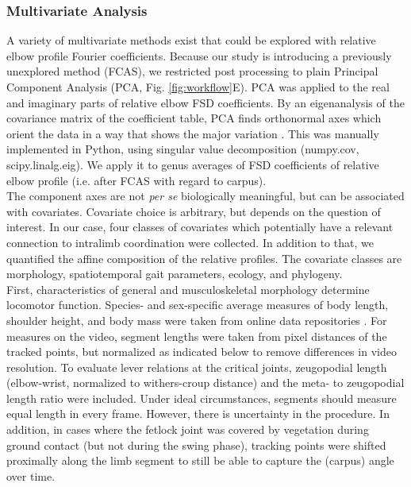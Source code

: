 \subsubsection{Multivariate Analysis}
A variety of multivariate methods exist that could be explored with relative elbow profile Fourier coefficients.
Because our study is introducing a previously unexplored method (FCAS), we restricted post processing to plain Principal Component Analysis (PCA, Fig. \ref{fig:workflow}E).
PCA was applied to the real and imaginary parts of relative elbow FSD coefficients.
By an eigenanalysis of the covariance matrix of the coefficient table, PCA finds orthonormal axes which orient the data in a way that shows the major variation \citep[\textit{cf.}][]{MacLeod2007}.
This was manually implemented in Python, using singular value decomposition (\textsf{numpy.cov}, \textsf{scipy.linalg.eig}).
We apply it to genus averages \citep{Mitteroecker2011} of FSD coefficients of relative elbow profile (i.e. after FCAS with regard to carpus).
\\The component axes are not \textit{per se} biologically meaningful, but can be associated with covariates.
Covariate choice is arbitrary, but depends on the question of interest.
In our case, four classes of covariates which potentially have a relevant connection to intralimb coordination were collected.
In addition to that, we quantified the affine composition of the relative profiles.
The covariate classes are morphology, spatiotemporal gait parameters, ecology, and phylogeny.
\\First, characteristics of general and musculoskeletal morphology determine locomotor function.
Species- and sex-specific average measures of body length, shoulder height, and body mass were taken from online data repositories \citep{UltimateUngulate,AnimalDiversityWeb}.
For measures on the video, segment lengths were taken from pixel distances of the tracked points, but normalized as indicated below to remove differences in video resolution.
To evaluate lever relations at the critical joints, zeugopodial length (elbow-wrist, normalized to withers-croup distance) and the meta- to zeugopodial length ratio were included.
Under ideal circumstances, segments should measure equal length in every frame.
However, there is uncertainty in the  procedure.
In addition, in cases where the fetlock joint was covered by vegetation during ground contact (but not during the swing phase), tracking points were shifted proximally along the limb segment to still be able to capture the (carpus)  angle over time.
